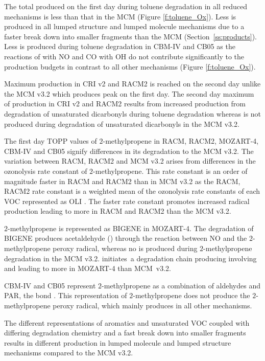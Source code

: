 The total  produced on the first day during toluene degradation in all reduced mechanisms is less than that in the MCM (Figure \ref{f:toluene_Ox}).
Less  is produced in all lumped structure and lumped molecule mechanisms due to a faster break down into smaller fragments than the MCM \mbox{(Section \ref{ss:products})}.
Less  is produced during toluene degradation in CBM-IV and CB05 as the reactions of  with NO and CO with OH do not contribute significantly to the  production budgets in contrast to all other mechanisms (Figure \ref{f:toluene_Ox}).

Maximum  production in CRI v2 and RACM2 is reached on the second day unlike the MCM v3.2 which produces peak  on the first day.
The second day maximum of  production in CRI v2 and RACM2 results from increased  production from degradation of unsaturated dicarbonyls during toluene degradation whereas  is not produced during degradation of unsaturated dicarbonyls in the MCM v3.2.

The first day TOPP values of $2$-methylpropene in RACM, RACM2, MOZART-4, CBM-IV and CB05 signify differences in its degradation to the MCM v3.2.
The variation between RACM, RACM2 and MCM v3.2 arises from differences in the ozonolysis rate constant of $2$-methylpropene.
This rate constant is an order of magnitude faster in RACM and RACM2 than in MCM v3.2 as the RACM, RACM2 rate constant is a weighted mean of the ozonolysis rate constants of each VOC represented as OLI \citep{Stockwell:1997, Goliff:2013}.
The faster rate constant promotes increased radical production leading to more  in RACM and RACM2 than the MCM v3.2.

$2$-methylpropene is represented as BIGENE in MOZART-4. 
The degradation of BIGENE produces acetaldehyde () through the reaction between NO and the $2$-methylpropene peroxy radical, whereas no  is produced during $2$-methylpropene degradation in the MCM v3.2.
 \mbox{initiates a} degradation chain producing  involving  and  leading to more  in MOZART-4 than \mbox{MCM v3.2}.

CBM-IV and CB05 represent $2$-methylpropene as a combination of aldehydes and PAR, the  bond \citep{Gery:1989, Yarwood:2005}.
This representation of $2$-methylpropene does not produce the $2$-methylpropene peroxy radical, which mainly produces  in all other mechanisms.

The different representations of aromatics and unsaturated VOC coupled with differing degradation chemistry and a fast break down into smaller fragments results in different  production in lumped molecule and lumped structure mechanisms compared to the MCM v3.2.
%
